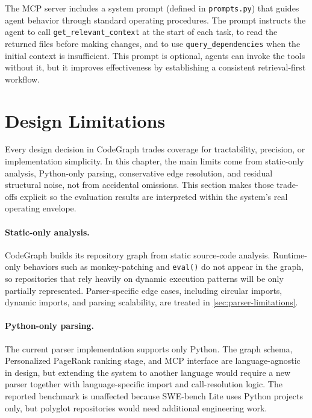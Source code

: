 The MCP server includes a system prompt (defined in \texttt{prompts.py}) that guides agent behavior through standard operating procedures. The prompt instructs the agent to call \texttt{get\_relevant\_context} at the start of each task, to read the returned files before making changes, and to use \texttt{query\_dependencies} when the initial context is insufficient. This prompt is optional, agents can invoke the tools without it, but it improves effectiveness by establishing a consistent retrieval-first workflow.


\section{Design Limitations}
\label{sec:design-limitations}

Every design decision in CodeGraph trades coverage for tractability, precision, or implementation simplicity. In this chapter, the main limits come from static-only analysis, Python-only parsing, conservative edge resolution, and residual structural noise, not from accidental omissions. This section makes those trade-offs explicit so the evaluation results are interpreted within the system's real operating envelope.

\paragraph{Static-only analysis.}
CodeGraph builds its repository graph from static source-code analysis. Runtime-only behaviors such as monkey-patching and \texttt{eval()} do not appear in the graph, so repositories that rely heavily on dynamic execution patterns will be only partially represented. Parser-specific edge cases, including circular imports, dynamic imports, and parsing scalability, are treated in \cref{sec:parser-limitations}.

\paragraph{Python-only parsing.}
The current parser implementation supports only Python. The graph schema, Personalized PageRank ranking stage, and MCP interface are language-agnostic in design, but extending the system to another language would require a new parser together with language-specific import and call-resolution logic. The reported benchmark is unaffected because SWE-bench Lite uses Python projects only, but polyglot repositories would need additional engineering work.

